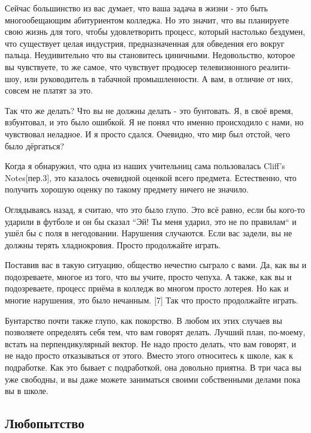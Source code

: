 \documentclass[ebook,12pt,oneside,openany]{memoir}
\begin{document}
Сейчас большинство из вас думает, что ваша задача в жизни - это быть
многообещающим абитуриентом колледжа. Но это значит, что вы планируете
свою жизнь для того, чтобы удовлетворить процесс, который настолько
бездумен, что существует целая индустрия, предназначенная для
обведения его вокруг пальца. Неудивительно что вы становитесь
циничными. Недовольство, которое вы чувствуете, то же самое, что
чувствует продюсер телевизионного реалити-шоу, или руководитель в
табачной промышленности. А вам, в отличие от них, совсем не платят за
это. \newline

Так что же делать? Что вы не должны делать - это бунтовать. Я, в своё
время, взбунтовал, и это было ошибкой. Я не понял что именно
происходило с нами, но чувствовал неладное. И я просто сдался.
Очевидно, что мир был отстой, чего было дёргаться? \newline

Когда я обнаружил, что одна из наших учительниц сама пользовалась
Cliff's Notes[пер.3], это казалось очевидной оценкой всего предмета.
Естественно, что получить хорошую оценку по такому предмету ничего не
значило. \newline

Оглядываясь назад, я считаю, что это было глупо. Это всё равно, если
бы кого-то ударили в футболе и он бы сказал ``Эй! Ты меня ударил, это
не по правилам`` и ушёл бы с поля в негодовании. Нарушения случаются.
Если вас задели, вы не должны терять хладнокровия. Просто продолжайте
играть. \newline

Поставив вас в такую ситуацию, общество нечестно сыграло с вами. Да,
как вы и подозреваете, многое из того, что вы учите, просто чепуха. А
также, как вы и подозреваете, процесс приёма в колледж во многом
просто лотерея. Но как и многие нарушения, это было нечанным. [7] Так
что просто продолжайте играть. \newline

Бунтарство почти также глупо, как покорство. В любом их этих случаев
вы позволяете определять себя тем, что вам говорят делать. Лучший
план, по-моему, встать на перпендикулярный вектор. Не надо просто
делать, что вам говорят, и не надо просто отказываться от этого.
Вместо этого относитесь к школе, как к подработке. Как это бывает с
подработкой, она довольно приятна. В три часа вы уже свободны, и вы
даже можете заниматься своими собственными делами пока вы в школе. \newline

\subsection{Любопытство}
\end{document}
